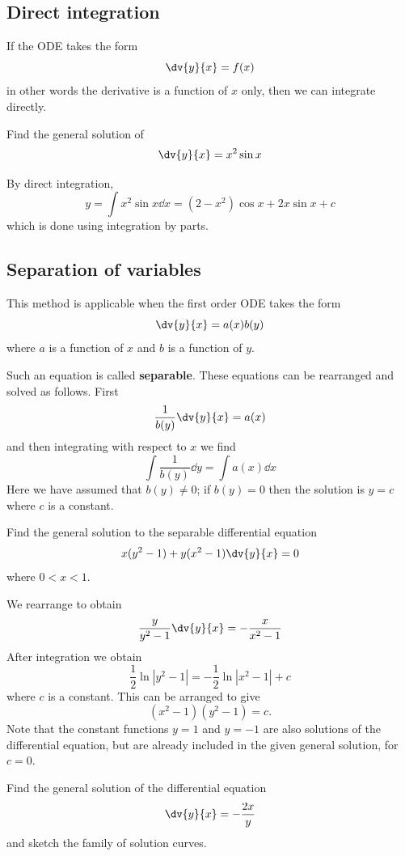 \subsection{Direct integration}
If the ODE takes the form
\[ \dv{y}{x} = f(x) \]
in other words the derivative is a function of $x$ only, then we can integrate directly.

\begin{exercise}{}{}
Find the general solution of
\[ \dv{y}{x} = x^2\sin x \]
\end{exercise}

\begin{solution}
By direct integration,
\[ y = \int x^2\sin x \dd{x} = (2-x^2) \cos x + 2x \sin x + c \]
which is done using integration by parts.
\end{solution}

\subsection{Separation of variables}
This method is applicable when the first order ODE takes the form
\[ \dv{y}{x} = a(x)b(y) \]
where $a$ is a function of $x$ and $b$ is a function of $y$. 

Such an equation is called \textbf{separable}. These equations can be rearranged and solved as follows. First
\[ \frac{1}{b(y)}\dv{y}{x} = a(x) \]
and then integrating with respect to $x$ we find
\[ \int \frac{1}{b(y)} \dd{y} = \int a(x) \dd{x} \]
Here we have assumed that $b(y) \neq 0$; if $b(y) = 0$ then the solution is $y = c$ where $c$ is a constant.

\begin{exercise}{}{}
Find the general solution to the separable differential equation
\[ x(y^2-1) + y(x^2-1)\dv{y}{x} = 0 \]
where $0<x<1$.
\end{exercise}

\begin{solution}
We rearrange to obtain
\[ \frac{y}{y^2-1}\dv{y}{x} = -\frac{x}{x^2-1} \]
After integration we obtain
\[ \frac{1}{2}\ln|y^2-1| = -\frac{1}{2}\ln|x^2-1| + c \]
where $c$ is a constant. This can be arranged to give
\[ (x^2-1)(y^2-1) = c. \]
Note that the constant functions $y=1$ and $y=-1$ are also solutions of the differential equation, but are already included in the given general solution, for $c=0$.
\end{solution}

\begin{exercise}{}{}
Find the general solution of the differential equation 
\[ \dv{y}{x}=-\frac{2x}{y} \]
and sketch the family of solution curves.
\end{exercise}

